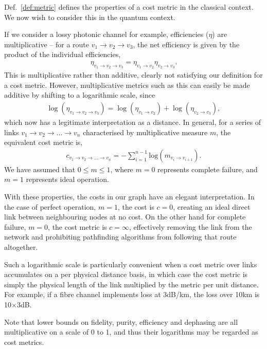 \documentclass[aps,rmp,twocolumn,amsmath,amssymb,nofootinbib,superscriptaddress,longbibliography,floatfix,table-of-contents,eqsecnum]{revtex4-1}
\begin{document}
Def.~\ref{def:metric} defines the properties of a cost metric in the classical context. We now wish to consider this in the quantum context.

If we consider a lossy photonic channel for example, efficiencies ($\eta$) are multiplicative -- for a route \mbox{$v_1\to v_2\to v_3$}, the net efficiency is given by the product of the individual efficiencies, \begin{align}
\eta_{v_1\to v_2 \to v_3} = \eta_{v_1\to v_2} \eta_{v_2\to v_3}.
\end{align}
This is multiplicative rather than additive, clearly not satisfying our definition for a cost metric. However, multiplicative metrics such as this can easily be made additive by shifting to a logarithmic scale, since
\begin{align}
\log(\eta_{v_1\to v_2\to v_3}) = \log(\eta_{v_1\to v_2}) + \log(\eta_{v_2\to v_3}),
\end{align}
which now has a legitimate interpretation as a distance. In general, for a series of links \mbox{$v_1\to v_2 \to \dots \to v_n$} characterised by multiplicative measure $m$, the equivalent cost metric is,
\begin{align} \label{eq:dist_log}
c_{v_1\to v_2 \to \dots \to v_n} = -\sum_{i=1}^{n-1} \text{log}(m_{v_i\to v_{i+1}}).
\end{align}
We have assumed that \mbox{$0\leq m \leq 1$}, where \mbox{$m=0$} represents complete failure, and \mbox{$m=1$} represents ideal operation.

With these properties, the costs in our graph have an elegant interpretation. In the case of perfect operation, \mbox{$m=1$}, the cost is \mbox{$c=0$}, creating an ideal direct link between neighbouring nodes at no cost. On the other hand for complete failure, \mbox{$m=0$}, the cost metric is \mbox{$c=\infty$}, effectively removing the link from the network and prohibiting pathfinding algorithms from following that route altogether.

Such a logarithmic scale is particularly convenient when a cost metric over links accumulates on a per physical distance basis, in which case the cost metric is simply the physical length of the link multiplied by the metric per unit distance. For example, if a fibre channel implements loss at 3dB/km, the loss over 10km is 10$\times$3dB.

Note that lower bounds on fidelity, purity, efficiency and dephasing are all multiplicative on a scale of 0 to 1, and thus their logarithms may be regarded as cost metrics.
\end{document}
